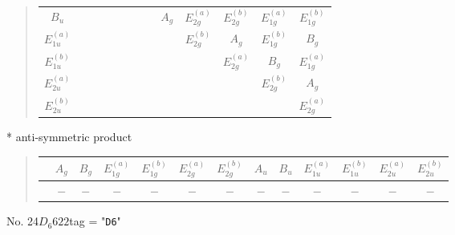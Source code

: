 \documentclass[fleqn,10pt,landscape]{jsarticle}
\begin{document}
\begin{quote}
\begin{tabular}{c|cccccccccccc}
$ B_{u} $ & $  $ & $  $ & $  $ & $  $ & $  $ & $  $ & $  $ & $ A_{g} $ & $ E_{2g}^{(a)} $ & $ E_{2g}^{(b)} $ & $ E_{1g}^{(a)} $ & $ E_{1g}^{(b)} $ \\
$ E_{1u}^{(a)} $ & $  $ & $  $ & $  $ & $  $ & $  $ & $  $ & $  $ & $  $ & $ E_{2g}^{(b)} $ & $ A_{g} $ & $ E_{1g}^{(b)} $ & $ B_{g} $ \\
$ E_{1u}^{(b)} $ & $  $ & $  $ & $  $ & $  $ & $  $ & $  $ & $  $ & $  $ & $  $ & $ E_{2g}^{(a)} $ & $ B_{g} $ & $ E_{1g}^{(a)} $ \\
$ E_{2u}^{(a)} $ & $  $ & $  $ & $  $ & $  $ & $  $ & $  $ & $  $ & $  $ & $  $ & $  $ & $ E_{2g}^{(b)} $ & $ A_{g} $ \\
$ E_{2u}^{(b)} $ & $  $ & $  $ & $  $ & $  $ & $  $ & $  $ & $  $ & $  $ & $  $ & $  $ & $  $ & $ E_{2g}^{(a)} $ \\
 \hline \hline
\end{tabular}
\end{quote}
* anti-symmetric product
\begin{quote}
\begin{tabular}{ccccccccccccc} \hline \hline
 & $ A_{g} $ & $ B_{g} $ & $ E_{1g}^{(a)} $ & $ E_{1g}^{(b)} $ & $ E_{2g}^{(a)} $ & $ E_{2g}^{(b)} $ & $ A_{u} $ & $ B_{u} $ & $ E_{1u}^{(a)} $ & $ E_{1u}^{(b)} $ & $ E_{2u}^{(a)} $ & $ E_{2u}^{(b)} $ \\ \hline
$  $ & $ - $ & $ - $ & $ - $ & $ - $ & $ - $ & $ - $ & $ - $ & $ - $ & $ - $ & $ - $ & $ - $ & $ - $ \\
 \hline \hline
\end{tabular}
\end{quote}
\newpage
No. 24\quad$D_{6}$\quad$622$\quad[ hexagonal ]
tag = "{\tt D6}"
\end{document}
